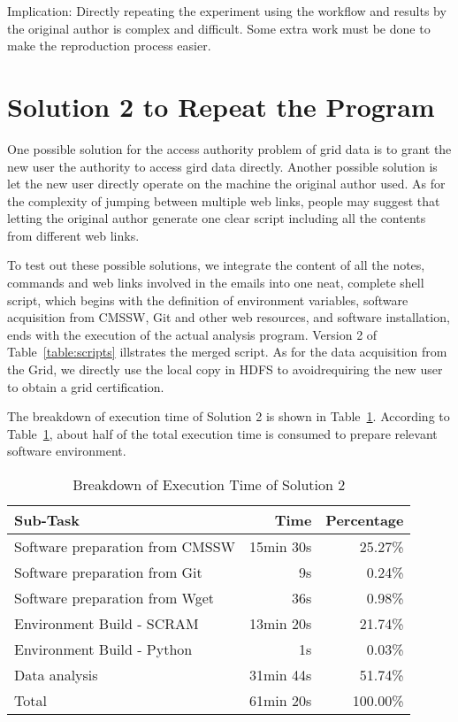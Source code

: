 \documentclass{acm_proc_article-sp}
\begin{document}
Implication: Directly repeating the experiment using the workflow and results by the original author is complex and difficult. Some extra work must be done to make the reproduction process easier.

\section{Solution 2 to Repeat the Program}
One possible solution for the access authority problem of grid data is to grant the new user the authority to access gird data directly. Another possible solution is let the new user directly operate on the machine the original author used. As for the complexity of jumping between multiple web links, people may suggest that letting the original author generate one clear script including all the contents from different web links.

To test out these possible solutions, we integrate the content of all the notes, commands and web links involved in the emails into one neat, complete shell script, which begins with the definition of environment variables, software acquisition from CMSSW, Git and other web resources, and software installation, ends with the execution of the actual analysis program. Version 2 of Table~\ref{table:scripts} illstrates the merged script. As for the data acquisition from the Grid, we directly use the local copy in HDFS to avoidrequiring the new user to obtain a grid certification.

The breakdown of execution time of Solution 2 is shown in Table~\ref{table:time-2nd}. According to Table~\ref{table:time-2nd}, about half of the total execution time is consumed to prepare relevant software environment.

\begin{table}
    \centering
    \begin{tabular}{|l|r|r|}
    \hline
    Sub-Task & Time & Percentage \\ \hline
    Software preparation from CMSSW & 15min 30s & 25.27\% \\ \hline
    Software preparation from Git & 9s & 0.24\% \\ \hline
    Software preparation from Wget & 36s & 0.98\% \\ \hline
    Environment Build - SCRAM & 13min 20s & 21.74\% \\ \hline
    Environment Build - Python & 1s & 0.03\% \\ \hline
    Data analysis & 31min 44s & 51.74\% \\ \hline
    Total & 61min 20s & 100.00\% \\ \hline
    \end{tabular}
    \caption{Breakdown of Execution Time of Solution 2}
    \label{table:time-2nd}
\end{table}
\end{document}
